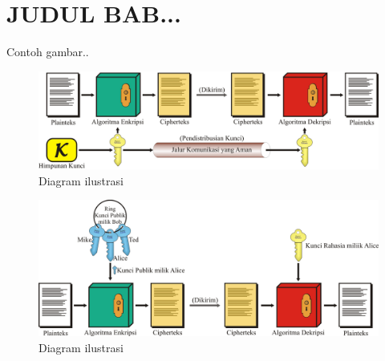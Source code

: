 \chapter{JUDUL BAB...}
Contoh gambar..
\begin{figure}[H]
\centering
\includegraphics[width=12cm]{skemasimetris}
\caption{Diagram ilustrasi}
\end{figure}
\bigskip
\begin{figure}[H]
\centering
\includegraphics[width=12cm]{skemaasimetris}
\caption{Diagram ilustrasi}
\end{figure}

